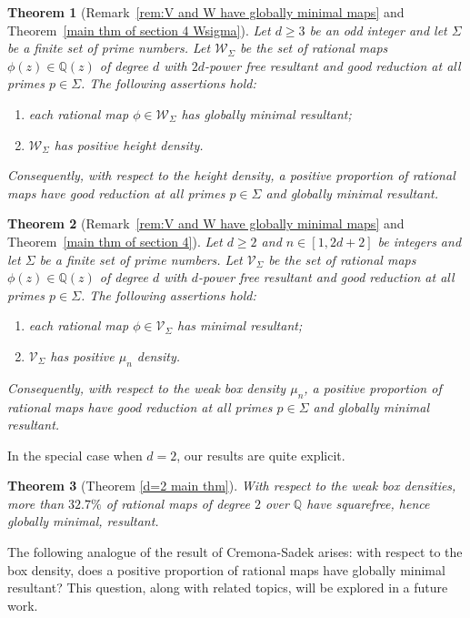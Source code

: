 \documentclass[12pt]{amsart}
\newtheorem{lthm}{Theorem}
\newcommand{\cW}{\mathcal{W}}
\newcommand{\Q}{\mathbb{Q}}
\numberwithin{equation}{section}
\begin{document}
\begin{lthm}[Remark~\ref{rem:V and W have globally minimal maps} and Theorem~\ref{main thm of section 4 Wsigma}]\label{thm a1}
    Let $d\geq 3$ be an odd integer and let $\Sigma$ be a finite set of prime numbers. Let $\cW_\Sigma$ be the set of rational maps $\phi(z)\in\Q(z)$ of degree $d$ with $2d$-power free resultant and good reduction at all primes $p\in \Sigma$. The following assertions hold:
    \begin{enumerate}
        \item each rational map $\phi\in \cW_\Sigma$ has globally minimal resultant;
        \item $\cW_\Sigma$ has positive height density.
    \end{enumerate}
    Consequently, with respect to the height density, a positive proportion of rational maps have good reduction at all primes $p\in \Sigma$ and globally minimal resultant.
\end{lthm}



\begin{lthm}[Remark~\ref{rem:V and W have globally minimal maps} and Theorem~\ref{main thm of section 4}]\label{thm a2}
    Let $d\geq 2$ and $n\in [1, 2d+2]$ be integers and let $\Sigma$ be a finite set of prime numbers. Let $\mathcal{V}_\Sigma$ be the set of rational maps $\phi(z)\in\Q(z)$ of degree $d$ with $d$-power free resultant and good reduction at all primes $p\in \Sigma$. The following assertions hold: 
    \begin{enumerate}
        \item each rational map $\phi\in \mathcal{V}_\Sigma$ has minimal resultant;
        \item $\mathcal{V}_\Sigma$ has positive $\mu_n$ density.
    \end{enumerate}Consequently, with respect to the weak box density $\mu_n$, a positive proportion of rational maps have good reduction at all primes $p\in \Sigma$ and globally minimal resultant.
\end{lthm}

In the special case when $d=2$, our results are quite explicit.
\begin{lthm}[Theorem \ref{d=2 main thm}]\label{thm b}
    With respect to the weak box densities, more than $32.7\%$ of rational maps of degree $2$ over $\Q$ have squarefree, hence globally minimal, resultant.
\end{lthm}

The following analogue of the result of Cremona-Sadek 
\cite{cremonasadek} arises: with respect to the box density, does a positive proportion of rational maps have globally minimal resultant? This question, along with related topics, will be explored in a future work.
\end{document}
